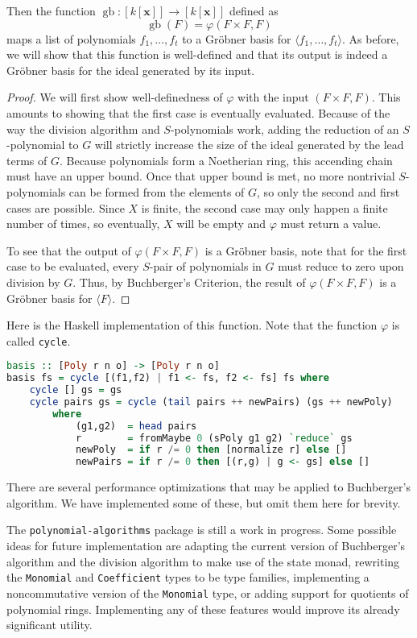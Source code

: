 \documentclass[MS, xcolor=dvipsnames]{wfuthesis}
\DeclareMathOperator{\gb}{gb}
\theoremstyle{definition}
\def\p{\varphi}
\begin{document}
Then the function $\gb: [k[\mathbf x]] \to [k[\mathbf x]]$ defined as
\[ \gb(F) = \p(F \times F,F) \]
maps a list of polynomials $f_1,\dots,f_t$ to a Gr\"obner basis for $\langle f_1,\dots,f_t \rangle$. As before, we will show that this function is well-defined and that its output is indeed a Gr\"obner basis for the ideal generated by its input.
\begin{proof}
  We will first show well-definedness of $\p$ with the input $(F \times F,F)$. This amounts to showing that the first case is eventually evaluated. Because of the way the division algorithm and $S$-polynomials work, adding the reduction of an $S$-polynomial to $G$ will strictly increase the size of the ideal generated by the lead terms of $G$. Because polynomials form a Noetherian ring, this accending chain must have an upper bound. Once that upper bound is met, no more nontrivial $S$-polynomials can be formed from the elements of $G$, so only the second and first cases are possible. Since $X$ is finite, the second case may only happen a finite number of times, so eventually, $X$ will be empty and $\p$ must return a value. \par
  To see that the output of $\p(F \times F,F)$ is a Gr\"obner basis, note that for the first case to be evaluated, every $S$-pair of polynomials in $G$ must reduce to zero upon division by $G$. Thus, by Buchberger's Criterion, the result of $\p(F \times F,F)$ is a Gr\"obner basis for $\langle F \rangle$.
\end{proof}
Here is the Haskell implementation of this function. Note that the function $\p$ is called \lstinline{cycle}.
\begin{lstlisting}[language=Haskell]
basis :: [Poly r n o] -> [Poly r n o]
basis fs = cycle [(f1,f2) | f1 <- fs, f2 <- fs] fs where
    cycle [] gs = gs
    cycle pairs gs = cycle (tail pairs ++ newPairs) (gs ++ newPoly)
        where
            (g1,g2)  = head pairs
            r        = fromMaybe 0 (sPoly g1 g2) `reduce` gs
            newPoly  = if r /= 0 then [normalize r] else []
            newPairs = if r /= 0 then [(r,g) | g <- gs] else []
\end{lstlisting}
There are several performance optimizations that may be applied to Buchberger's algorithm. We have implemented some of these, but omit them here for brevity. \par 
The \lstinline{polynomial-algorithms} package is still a work in progress. Some possible ideas for future implementation are adapting the current version of Buchberger's algorithm and the division algorithm to make use of the state monad, rewriting the \lstinline{Monomial} and \lstinline{Coefficient} types to be type families, implementing a noncommutative version of the \lstinline{Monomial} type, or adding support for quotients of polynomial rings. Implementing any of these features would improve its already significant utility.
\end{document}
